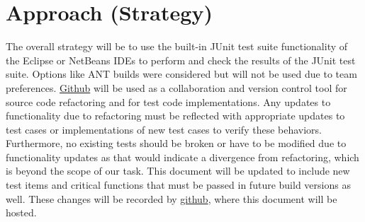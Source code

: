 \documentclass{article}
\begin{document}
\section{Approach (Strategy)}
The overall strategy will be to use the built-in JUnit test suite functionality of the Eclipse or NetBeans IDEs to perform and check the results of the JUnit test suite. Options like ANT builds were considered but will not be used due to team preferences. \href{https://www.github.com/audiolion/422AppDevGroup1}{Github} will be used as a collaboration and version control tool for source code refactoring and for test code implementations. Any updates to functionality due to refactoring must be reflected with appropriate updates to test cases or implementations of new test cases to verify these behaviors. Furthermore, no existing tests should be broken or have to be modified due to functionality updates as that would indicate a divergence from refactoring, which is beyond the scope of our task. This document will be updated to include new test items and critical functions that must be passed in future build versions as well. These changes will be recorded by \href{https://www.github.com/audiolion/422AppDevGroup1}{github}, where this document will be hosted.
\end{document}
